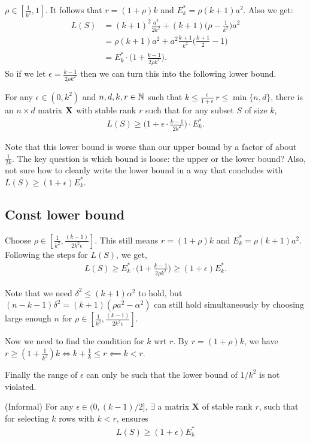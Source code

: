 \documentclass[12pt]{sty/colt2019/colt2018-arxiv}
\begin{document}
$\rho\in[\frac1{k^2},1]$. It follows that $r=(1+\rho)k$ and
$E_k^*=\rho(k+1)a^2$. Also we get:
\begin{align*}
  L(S)&=  (k+1)^2 \frac{a^2}{2k^2} + (k+1)\Big(\rho-\frac1{k^2}\Big) a^2\\
      &=\rho(k+1)a^2 + a^2\frac{k+1}{k^2}\Big(\frac{k+1}{2} - 1\Big)\\
  &=E_k^*\cdot\Big(1 + \frac{k-1}{2\rho k^2}\Big).
\end{align*}
So if we let $\epsilon = \frac{k-1}{2\rho k^2}$ then we can turn
this into the following lower bound. 
\begin{theorem}
  For any $\epsilon\in(0,k^2)$ and $n,d,k,r\in\mathbb N$ such
  that $k\leq\frac{\epsilon}{1+\epsilon}\,r\leq\min\{n,d\}$, there is
  an $n\times d$ matrix $\mathbf X$ with stable rank  
  $r$ such that for any subset $S$ of size $k$,
  \begin{align*}
    L(S) \geq \bigg(1+\epsilon\cdot \frac{k-1}{2k^2}\bigg)\cdot E_k^*.
  \end{align*}
\end{theorem}
Note that this lower bound is worse than our upper bound by a factor
of about $\frac1{2k}$. The key question is which bound is loose: the
upper or the lower bound? Also, not sure how to cleanly
write the lower bound
in a way that concludes with $L(S)\geq (1+\epsilon) E_k^*$.


\subsection{Const lower bound}
Choose $\rho \in [\frac1 {k^2}, \frac{(k-1)}{2k^2\epsilon} ]$. This still means $r=(1+\rho)k$ and
$E_k^*=\rho(k+1)a^2$. Following the steps for $L(S)$, we get,
\begin{align*}
L(S) \geq E_k^*\cdot\Big(1 + \frac{k-1}{2\rho k^2}\Big) \geq (1 + \epsilon) E_k^*.
\end{align*}

Note that we need $\delta^2 \leq (k+1) \alpha^2$ to hold, but  $(n-k-1)\delta^2 = (k+1)(\rho a^2-\alpha^2)$ can still hold simultaneously by choosing large enough $n$ for  $\rho \in [\frac1 {k^2},\frac{(k-1)}{2k^2\epsilon} ]$.

Now we need to find the condition for $k$ wrt $r$. By $r = (1+\rho)k$, we have $r \geq  (1+\frac1{k^2})k \iff k + \frac1 k \leq r \impliedby k < r$.

Finally the range of $\epsilon$ can only be such that the lower bound of $1/k^2$ is not violated.

\begin{theorem}(Informal) For any $\epsilon \in (0,(k-1)/2 ]$, $\exists$ a matrix $\mathbf{X} $ of stable rank $r$, such that for selecting $k$ rows with $k < r$, ensures 
	\begin{align*}
	L(S) \geq (1+\epsilon) E^*_k
	\end{align*}
	
\end{theorem}
\end{document}
